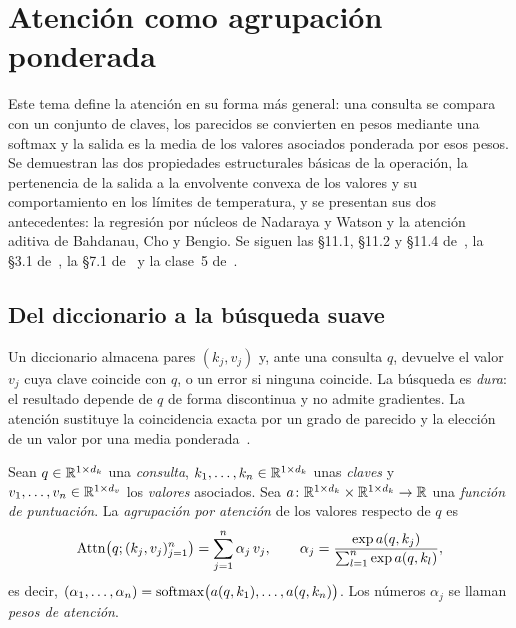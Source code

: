 \chapter{Atención como agrupación ponderada}
\label{tema:1}

Este tema define la atención en su forma más general: una consulta se compara con un conjunto de claves, los parecidos se convierten en pesos mediante una softmax y la salida es la media de los valores asociados ponderada por esos pesos. Se demuestran las dos propiedades estructurales básicas de la operación, la pertenencia de la salida a la envolvente convexa de los valores y su comportamiento en los límites de temperatura, y se presentan sus dos antecedentes: la regresión por núcleos de Nadaraya y Watson y la atención aditiva de Bahdanau, Cho y Bengio. Se siguen las §11.1, §11.2 y §11.4 de~\cite{d2l}, la §3.1 de~\cite{bahdanau}, la §7.1 de~\cite{jm3} y la clase~5 de~\cite{cs224n}.

\section{Del diccionario a la búsqueda suave}

Un diccionario almacena pares $(k_j,v_j)$ y, ante una consulta $q$, devuelve el valor $v_j$ cuya clave coincide con $q$, o un error si ninguna coincide. La búsqueda es \emph{dura}: el resultado depende de $q$ de forma discontinua y no admite gradientes. La atención sustituye la coincidencia exacta por un grado de parecido y la elección de un valor por una media ponderada~\cite[§11.1]{d2l}.

\begin{definicion}\label{def:agrupacion}
Sean $q\in\mathbb{R}^{1\times d_k}$ una \emph{consulta}, $k_1,\dots,k_n\in\mathbb{R}^{1\times d_k}$ unas \emph{claves} y $v_1,\dots,v_n\in\mathbb{R}^{1\times d_v}$ los \emph{valores} asociados. Sea $a\colon\mathbb{R}^{1\times d_k}\times\mathbb{R}^{1\times d_k}\to\mathbb{R}$ una \emph{función de puntuación}. La \emph{agrupación por atención} de los valores respecto de $q$ es
\[
\operatorname{Attn}\bigl(q;(k_j,v_j)_{j=1}^{n}\bigr)=\sum_{j=1}^{n}\alpha_j\,v_j,\qquad
\alpha_j=\frac{\exp a(q,k_j)}{\sum_{l=1}^{n}\exp a(q,k_l)},
\]
es decir, $(\alpha_1,\dots,\alpha_n)=\operatorname{softmax}\bigl(a(q,k_1),\dots,a(q,k_n)\bigr)$. Los números $\alpha_j$ se llaman \emph{pesos de atención}.
\end{definicion}

